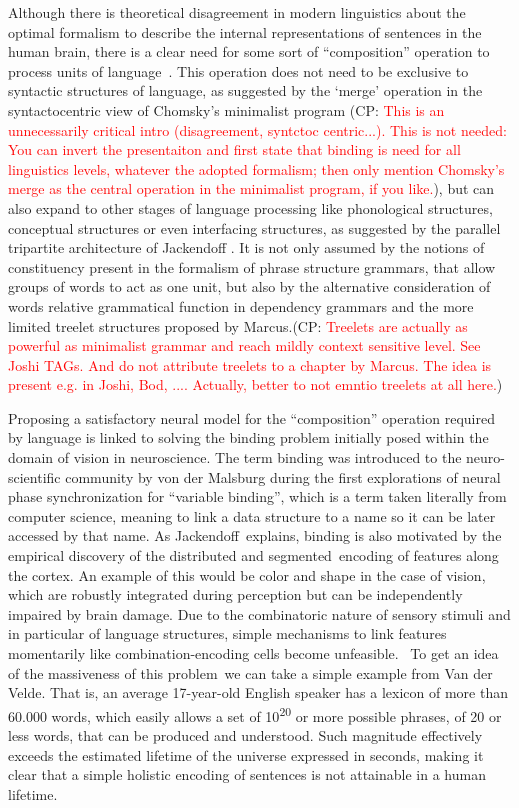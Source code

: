 \documentclass[10pt]{article}
\newcommand{\noteCP}[1]{(CP: \textcolor{red}{#1})}
\begin{document}
Although there is theoretical disagreement in modern linguistics about
the optimal formalism to describe the internal representations of
sentences in the human brain, there is a clear need for some sort of
``composition'' operation to process units of
language~\cite{Dehaene_2015}. This operation does not need to be
exclusive to syntactic structures of language, as suggested by the
`merge' operation in the syntactocentric view of Chomsky's minimalist
program \cite{Chomsky_2013}\noteCP{This is an unnecessarily critical intro (disagreement, syntctoc centric...). This is not needed: You can invert the presentaiton and first state that binding is need for all linguistics levels, whatever the adopted formalism; then only mention Chomsky's merge as the central operation in  the minimalist program,  if you like.}, but can also expand to other stages of
language processing like phonological structures, conceptual structures
or even interfacing structures, as suggested by the parallel tripartite
architecture of Jackendoff \cite{Jackendoff_2002a}. It is not only assumed by
the notions of constituency present in the formalism of phrase structure
grammars, that allow groups of words to act as one unit, but also by the
alternative consideration of words relative grammatical function in
dependency grammars and the more limited treelet structures proposed by
Marcus\cite{marcus2013evolution}.\noteCP{Treelets are actually as powerful as minimalist grammar and reach mildly context sensitive level. See Joshi TAGs. And do not attribute treelets to a chapter by Marcus. The idea is present e.g. in Joshi, Bod, .... Actually, better to not emntio treelets at all here.} 

Proposing a satisfactory neural model for the ``composition'' operation
required by language is linked to solving the binding problem initially
posed within the domain of vision in neuroscience. The term binding was
introduced to the neuro-scientific community by von der
Malsburg\cite{von_der_Malsburg_1994} during the first explorations of neural phase
synchronization for ``variable binding'', which is a term taken
literally from computer science, meaning to link a data structure to a
name so it can be later accessed by that name. As
Jackendoff\cite{Jackendoff_2002b}~explains, binding is also motivated by the
empirical discovery of the distributed and segmented~encoding of
features along the cortex. An example of this would be color and shape
in the case of vision, which are robustly integrated during perception
but can be independently impaired by brain damage. Due to the
combinatoric nature of sensory stimuli and in particular of language
structures, simple mechanisms to link features momentarily like
combination-encoding cells become unfeasible\cite{von_der_Malsburg_1999}. ~To get an idea of the massiveness of this problem~we can take a simple example
from Van der Velde\cite{van_der_Velde_2006}. That is, an average 17-year-old
English speaker has a lexicon of more than 60.000 words, which easily
allows a set of 10\textsuperscript{20} or more possible phrases, of 20
or less words, that can be produced and understood. Such magnitude
effectively exceeds the estimated lifetime of the universe expressed in
seconds, making it clear that a simple holistic encoding of sentences is not
attainable in a human lifetime.
\end{document}
